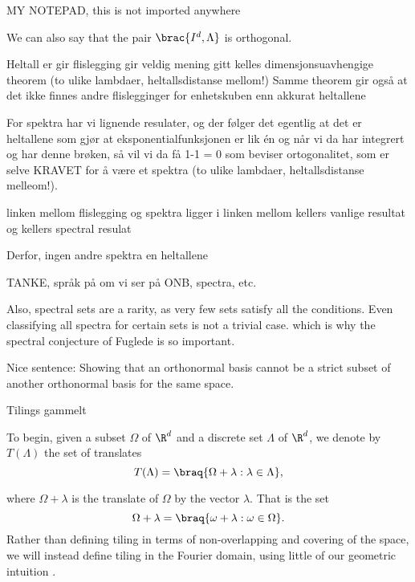 

MY NOTEPAD, this is not imported anywhere

\begin{remark}
    We can also say that the pair $\brac{I^d,\Lambda}$ is orthogonal. 
\end{remark} 


Heltall er gir flislegging gir veldig mening gitt kelles dimensjonsuavhengige theorem (to ulike lambdaer, heltallsdistanse mellom!)
Samme theorem gir også at det ikke finnes andre flislegginger for enhetskuben enn akkurat heltallene

For spektra har vi lignende resulater, og der følger det egentlig at det er heltallene som gjør at eksponentialfunksjonen er lik én
og når vi da har integrert og har denne brøken, så vil vi da få 1-1 = 0 som beviser ortogonalitet, som er selve KRAVET for å være et spektra
(to ulike lambdaer, heltallsdistanse melleom!). 


linken mellom flislegging og spektra ligger i linken mellom kellers vanlige resultat og kellers spectral resulat

Derfor, ingen andre spektra en heltallene

TANKE, språk på om vi ser på ONB, spectra, etc.

Also, spectral sets are a rarity, as very few sets satisfy all the conditions. 
Even classifying all spectra for certain sets is not a trivial case. which is why the spectral conjecture of Fuglede is so important. 


Nice sentence: Showing that an orthonormal basis cannot be a strict subset of another orthonormal basis for the same space. 


Tilings gammelt

To begin, given a subset $\Omega$ of $\R^d$ and a discrete set $\Lambda$ of $\R^d$, we denote by $T(\Lambda)$ the set of translates 
\begin{equation*}
    T(\Lambda) = \braq{\Omega+\lambda : \lambda\in \Lambda},
\end{equation*}

where $\Omega + \lambda$ is the translate of $\Omega$ by the vector $\lambda$. That is the set
\begin{equation*}
    \Omega + \lambda = \braq{\omega + \lambda : \omega \in \Omega}.
\end{equation*}
Rather than defining tiling in terms of non-overlapping and covering of the space, we will instead define tiling in the Fourier domain, using little of our geometric intuition \cite{kolountzakisTilingsTranslation2010} \cite{kolountzakisStudyTranslationalTiling2003}. 

